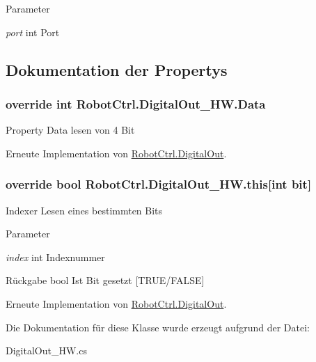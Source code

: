 \begin{DoxyParams}{Parameter}
\item[{\em port}]int Port \end{DoxyParams}


\subsection{Dokumentation der Propertys}
\hypertarget{class_robot_ctrl_1_1_digital_out___h_w_ae374c259f09079b63f2bb6533e6ce5de}{
\subsubsection[{Data}]{\setlength{\rightskip}{0pt plus 5cm}override int RobotCtrl.DigitalOut\_\-HW.Data}}
\label{class_robot_ctrl_1_1_digital_out___h_w_ae374c259f09079b63f2bb6533e6ce5de}
Property Data lesen von 4 Bit 

Erneute Implementation von \hyperlink{class_robot_ctrl_1_1_digital_out_a4c85a4bab149666840e9a551f62b6305}{RobotCtrl.DigitalOut}.

\hypertarget{class_robot_ctrl_1_1_digital_out___h_w_a76f77544e88287efb3b2f273429b2ff0}{
\subsubsection[{this}]{\setlength{\rightskip}{0pt plus 5cm}override bool RobotCtrl.DigitalOut\_\-HW.this\mbox{[}int bit\mbox{]}}}
\label{class_robot_ctrl_1_1_digital_out___h_w_a76f77544e88287efb3b2f273429b2ff0}
Indexer Lesen eines bestimmten Bits


\begin{DoxyParams}{Parameter}
\item[{\em index}]int Indexnummer \end{DoxyParams}
\begin{DoxyReturn}{Rückgabe}
bool Ist Bit gesetzt \mbox{[}TRUE/FALSE\mbox{]} 
\end{DoxyReturn}


Erneute Implementation von \hyperlink{class_robot_ctrl_1_1_digital_out_a4f57b73a7591bb053e7025eebb26d577}{RobotCtrl.DigitalOut}.



Die Dokumentation für diese Klasse wurde erzeugt aufgrund der Datei:\begin{DoxyCompactItemize}
\item 
DigitalOut\_\-HW.cs\end{DoxyCompactItemize}
